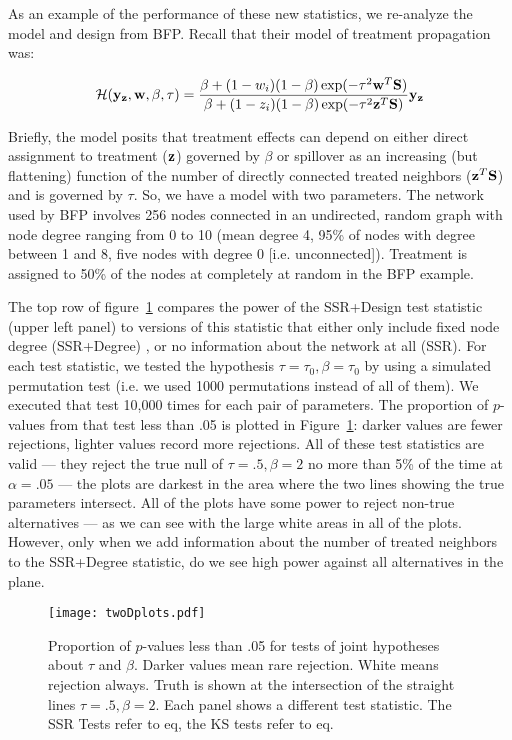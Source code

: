 As an example of the performance of these new statistics, we re-analyze the
model and design from BFP. Recall that their model of treatment propagation
was:

\begin{equation}
\mathcal{H}(\mathbf{y}_{\mathbf{z}}, \mathbf{w}, \beta, \tau) =
 \frac{\beta + (1 - w_i) (1 - \beta) \exp(- \tau^2 \mathbf{w}^{T} \mathbf{S})}
      {\beta + (1 - z_i) (1 - \beta) \exp(- \tau^2 \mathbf{z}^{T} \mathbf{S})} \mathbf{y}_{\mathbf{z}}
\label{eq:spillovermodelA}
\end{equation}

Briefly, the model posits that treatment effects can depend on either direct
assignment to treatment ($\mathbf{z}$) governed by $\beta$ or spillover as an
increasing (but flattening) function of the number of directly connected
treated neighbors ($\mathbf{z}^{T} \mathbf{S}$) and is governed by $\tau$. So, we have a
model with two parameters. The network used by BFP involves 256 nodes
connected in an undirected, random graph with node degree ranging from 0 to 10
(mean degree 4, 95\% of nodes with degree between 1 and 8, five nodes with
degree 0 [i.e. unconnected]).  Treatment is assigned to 50\% of the nodes at
completely at random in the BFP example.

The top row of figure~\ref{fig:twoD} compares the power of the SSR+Design test
statistic (upper left panel) to versions of this statistic that either only
include fixed node degree (SSR+Degree) , or no information about the network
at all (SSR). For each test statistic, we tested the hypothesis
$\tau=\tau_0,\beta=\tau_0$ by using a simulated permutation test (i.e. we used
1000 permutations instead of all of them). We executed that test 10,000 times
for each pair of parameters.  The proportion of $p$-values from that test less
than .05 is plotted in Figure~\ref{fig:twoD}: darker values are fewer
rejections, lighter values record more rejections.  All of these test
statistics are valid --- they reject the true null of $\tau=.5,\beta=2$ no
more than 5\% of the time at $\alpha=.05$ --- the plots are darkest in the
area where the two lines showing the true parameters intersect. All of the
plots have some power to reject non-true alternatives --- as we can see with
the large white areas in all of the plots. However, only when we add
information about the number of treated neighbors to the SSR+Degree
statistic, do we see high power against all alternatives in the plane.


\begin{figure}[h!]
\centering
\texttt{[image: twoDplots.pdf]}
\caption{Proportion of $p$-values less than .05 for tests of joint hypotheses
about $\tau$ and $\beta$. Darker values mean rare rejection. White means
rejection always. Truth is shown at the intersection of the straight
lines  $\tau=.5, \beta=2$. Each panel shows a different test statistic. The
SSR Tests refer to eq, the KS tests refer to eq.  }\label{fig:twoD}
\end{figure}

